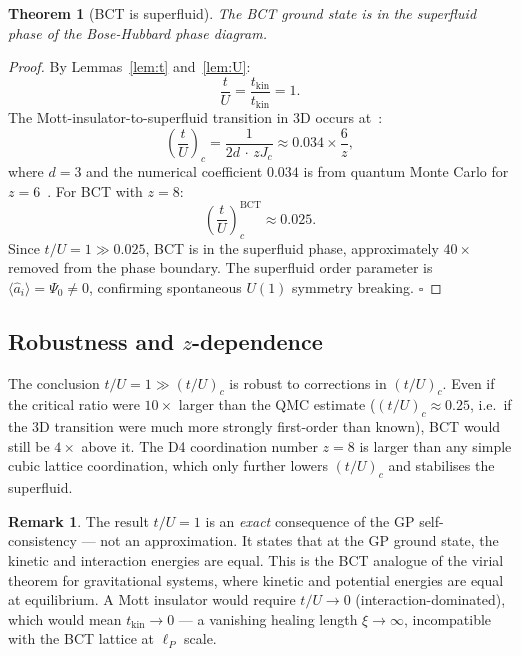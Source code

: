 \documentclass[11pt,a4paper]{article}
\theoremstyle{bctthm}
\newtheorem{theorem}{Theorem}
\theoremstyle{definition}
\newtheorem{remark}{Remark}
\begin{document}
\begin{theorem}[BCT is superfluid]\label{thm:sf}
The BCT ground state is in the superfluid phase of the
Bose-Hubbard phase diagram.
\end{theorem}
\begin{proof}
By Lemmas~\ref{lem:t} and~\ref{lem:U}:
\begin{equation}
\frac{t}{U} = \frac{t_\mathrm{kin}}{t_\mathrm{kin}} = 1.
\label{eq:tU1}
\end{equation}
The Mott-insulator-to-superfluid transition in 3D occurs at~\cite{fisher1989}:
\begin{equation}
\left(\frac{t}{U}\right)_c = \frac{1}{2d\,\cdot\,zJ_c}
\approx 0.034 \times \frac{6}{z},
\end{equation}
where $d=3$ and the numerical coefficient $0.034$ is from
quantum Monte Carlo for $z=6$~\cite{capogrosso2007}.
For BCT with $z=8$:
\begin{equation}
\left(\frac{t}{U}\right)_c^\mathrm{BCT} \approx 0.025.
\end{equation}
Since $t/U = 1 \gg 0.025$, BCT is in the superfluid phase,
approximately $40\times$ removed from the phase boundary.
The superfluid order parameter is $\langle\hat{a}_i\rangle = \Psi_0 \neq 0$,
confirming spontaneous $U(1)$ symmetry breaking. $\square$
\end{proof}

\subsection{Robustness and $z$-dependence}

The conclusion $t/U = 1 \gg (t/U)_c$ is robust to corrections
in $(t/U)_c$. Even if the critical ratio were $10\times$ larger
than the QMC estimate ($(t/U)_c \approx 0.25$, i.e.\ if the 3D
transition were much more strongly first-order than known), BCT
would still be $4\times$ above it. The D4 coordination number
$z=8$ is larger than any simple cubic lattice coordination, which
only further lowers $(t/U)_c$ and stabilises the superfluid.

\begin{remark}
The result $t/U = 1$ is an \emph{exact} consequence of the GP
self-consistency — not an approximation. It states that at the GP
ground state, the kinetic and interaction energies are equal.
This is the BCT analogue of the virial theorem for gravitational systems,
where kinetic and potential energies are equal at equilibrium.
A Mott insulator would require $t/U \to 0$ (interaction-dominated),
which would mean $t_\mathrm{kin} \to 0$ — a vanishing healing
length $\xi \to \infty$, incompatible with the BCT lattice
at $\ell_P$ scale.
\end{remark}
\end{document}
